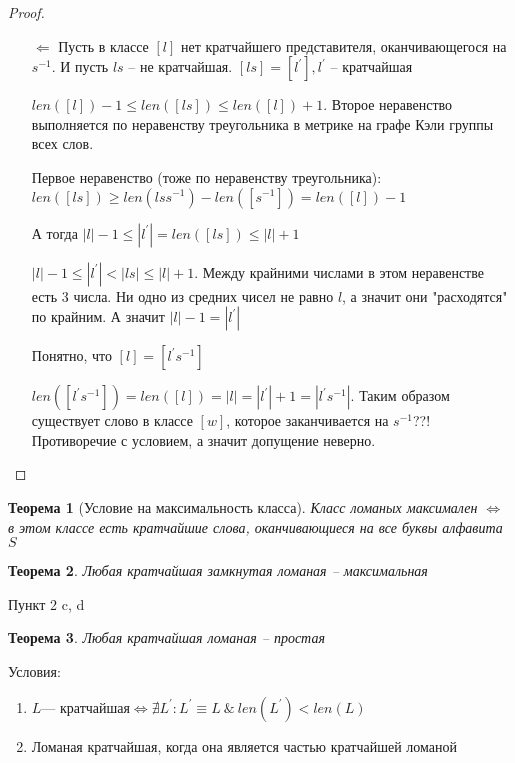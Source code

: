 \documentclass[serif, ucs]{beamer}
\newtheorem{Th}{Теорема}[section]
\newcommand{\p}[1]{#1^{\prime}}
\begin{document}
\begin{frame}
\begin{footnotesize}
\begin{proof}
	\begin{itemize}
		\item[$\Leftarrow$] Пусть в классе $[l]$ нет кратчайшего представителя, оканчивающегося на $s^{-1}$. И пусть $ls$ -- не кратчайшая. $[ls] = [\p l], \p l$ -- кратчайшая
		
		$len([l]) - 1 \leqslant len([ls])\leqslant len([l]) + 1$. Второе неравенство выполняется по неравенству треугольника в метрике на графе Кэли группы всех слов.
		
		Первое неравенство (тоже по неравенству треугольника): $len([ls])\geqslant len(lss^{-1}) - len([s^{-1}]) = len([l]) - 1$
		
		А тогда $|l|-1 \leqslant |\p l | = len([ls])\leqslant |l| + 1$
		
		$|l| - 1\leqslant |\p l |<|ls|\leqslant |l|+1$. Между крайними числами в этом неравенстве есть 3 числа. Ни одно из средних чисел не равно $l$, а значит они "расходятся" по крайним. А значит $|l|-1 = |\p l|$

		Понятно, что $[l] = [\p l s^{-1}]$		
		
		$len([\p ls^{-1}]) = len([l]) = |l| = |\p l| + 1 = |\p l s^{-1}|$. Таким образом существует слово в классе $[w]$, которое заканчивается на $s^{-1}$??! Противоречие с условием, а значит допущение неверно.
	\end{itemize}
\end{proof}
\end{footnotesize}
\end{frame}

\begin{frame}
	\begin{Th}[Условие на максимальность класса]
		Класс ломаных максимален $\Longleftrightarrow$ в этом классе есть кратчайшие слова, оканчивающиеся на все буквы алфавита $S$
	\end{Th}
	
	\begin{Th}
		Любая кратчайшая замкнутая ломаная -- максимальная
	\end{Th}
\end{frame}

\begin{frame}{Пункт 2 c, d}
	\begin{Th}
		Любая кратчайшая ломаная -- простая
	\end{Th}
	
	Условия:
	\begin{enumerate}
		\item $L \text{--- кратчайшая}\Longleftrightarrow\nexists \p L: \p L\equiv L ~\&~ len(\p L)<len(L)$
		\item Ломаная кратчайшая, когда она является частью кратчайшей ломаной
	\end{enumerate}
\end{frame}
\end{document}
